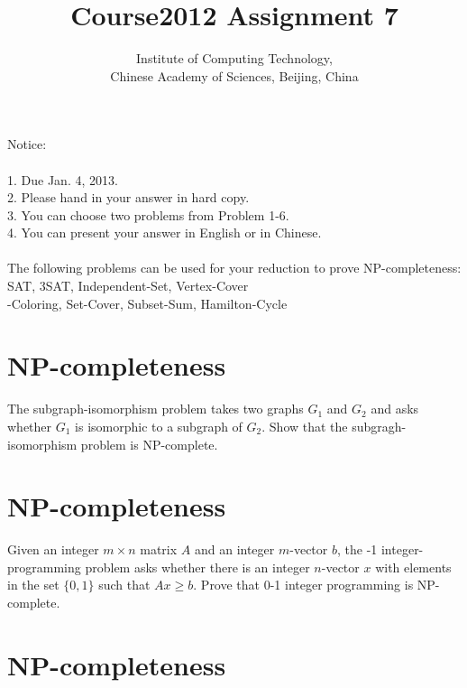 \documentclass[a4paper,11pt]{article}
\title{Course2012 Assignment 7}
\author{Institute of Computing Technology, \\
                       Chinese Academy of Sciences, Beijing, China }
\begin{document}
\maketitle

Notice:\\\\
1. Due Jan. 4,  2013.\\
2. Please hand in your answer in hard copy.\\
3. You can choose two problems from Problem 1-6.\\
4. You can present your answer in English or in Chinese.\\\\
The following problems can be used for your reduction to prove NP-completeness: \\
{\sc SAT}, {\sc 3SAT}, {\sc Independent-Set}, {\sc Vertex-Cover}\\
{-Coloring}, {\sc Set-Cover}, {\sc Subset-Sum}, {\sc Hamilton-Cycle}\\
% 

\section{NP-completeness}

The {\sc subgraph-isomorphism} problem takes two graphs $G_1$ and $G_2$ and asks whether $G_1$ is isomorphic to a subgraph of $G_2$. Show that the subgragh-isomorphism problem is NP-complete.

\section{NP-completeness}

Given an integer $m\times n$ matrix $A$ and an integer $m$-vector $b$, the {-1 integer-programming} problem asks whether there is an integer $n$-vector $x$ with elements in the set $\{0,1 \}$ such that $Ax\geq b$. Prove that 0-1 integer programming is NP-complete.

\section{NP-completeness}
\end{document}
